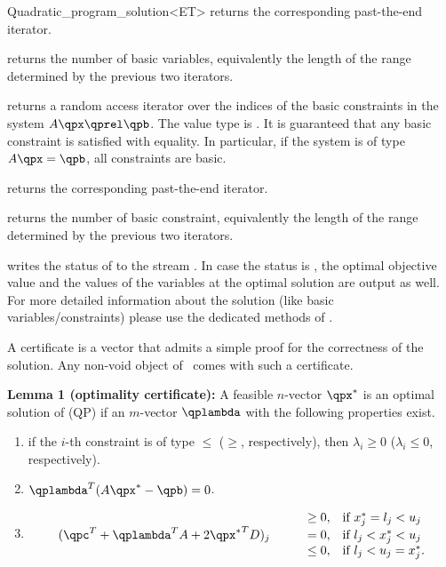 \begin{ccRefClass}{Quadratic_program_solution<ET>}
{returns the corresponding past-the-end iterator.}

{returns the number of basic variables, equivalently the length
of the range determined by the previous two iterators.}

\ccExample
{}

{returns a random access iterator over the indices of the basic
constraints in the system $A\qpx\qprel \qpb$. The value type is . 
It is guaranteed that any basic constraint is satisfied with equality.
In particular, if the system is of type $A\qpx=\qpb$, all constraints are
basic.}

{returns the corresponding past-the-end iterator.}

{returns the number of basic constraint, equivalently the length
of the range determined by the previous two iterators.}

\ccExample
{}


{writes the status of  to the stream . In case the
status is , the optimal objective value and the values
of the variables at the optimal solution are output as well. For more
detailed information about the solution (like basic variables/constraints) 
please use the dedicated methods of .}

\begin{ccAdvanced}

A certificate is a vector that admits a simple proof for the 
correctness of the solution. Any non-void object of \ccRefName\ 
comes with such a certificate.

{\bf Lemma 1 (optimality certificate):} A feasible $n$-vector $\qpx^*$ 
is an optimal solution of (QP) if an $m$-vector $\qplambda$ with the
following properties exist.
\begin{enumerate}
\item if the $i$-th constraint is of type $\leq$ ($\geq$, respectively), 
then $\lambda_i\geq 0$ ($\lambda_i\leq 0$, respectively).
\item $\qplambda^T(A\qpx^*-\qpb) = 0$.
\item \[
\begin{array}{llll}
&&\geq 0, & \mbox{if $x^*_j = l_j < u_j$} \\
(\qpc^T + \qplambda^T A + 2{\qpx^*}^TD)_j& \quad  &= 0, & \mbox{if $l_j < x^*_j < u_j$} \\
&&\leq 0, & \mbox{if $l_j < u_j = x^*_j$.}
\end{array}\]
\end{enumerate}


\end{ccAdvanced}
\end{ccRefClass}
